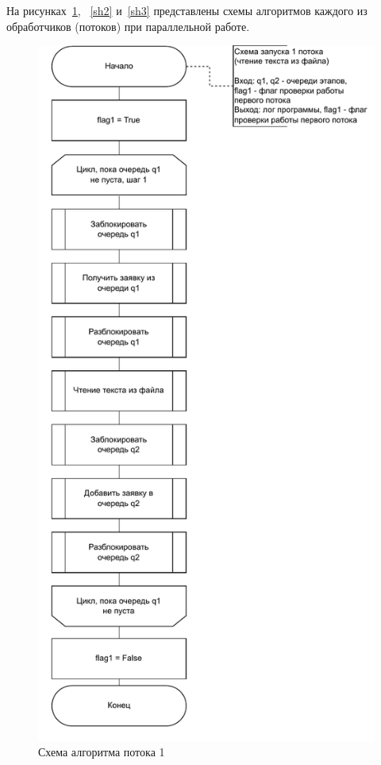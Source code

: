 На рисунках~\ref{sh1}, ~\ref{sh2} и~\ref{sh3} представлены схемы алгоритмов каждого из обработчиков (потоков) при параллельной работе.

\begin{figure}[h]
	\centering
	\includegraphics[scale=0.72]{photos/thread1}
	\caption{Схема алгоритма потока 1}
	\label{sh1}
\end{figure}
\clearpage

